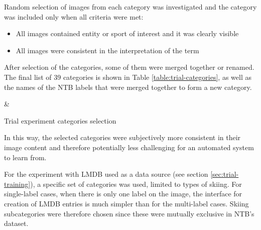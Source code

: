     Random selection of images from each category was investigated and the category was included only when all criteria were met:
    \begin{itemize}
        \item All images contained entity or sport of interest and it was clearly visible
        \item All images were consistent in the interpretation of the term
    \end{itemize}
    
    After selection of the categories, some of them were merged together or renamed. The final list of 39 categories is shown in Table \ref{table:trial-categories}, as well as the names of the NTB labels that were merged together to form a new category.
    
    \begin{table}[H]
    \small
    \centering
    {}
    {\category & \ntbcategories}
    
    \caption{Trial experiment categories selection}
    \label{table:trial-categories}
    \end{table}
    
    In this way, the selected categories were subjectively more consistent in their image content and therefore potentially less challenging for an automated system to learn from.
    
    For the experiment with LMDB \cite{lmdb} used as a data source (see section \ref{sec:trial-training}), a specific set of categories was used, limited to types of skiing. For single-label cases, when there is only one label on the image, the interface for creation of LMDB entries is much simpler than for the multi-label cases. Skiing subcategories were therefore chosen since these were mutually exclusive in NTB's dataset.
    
